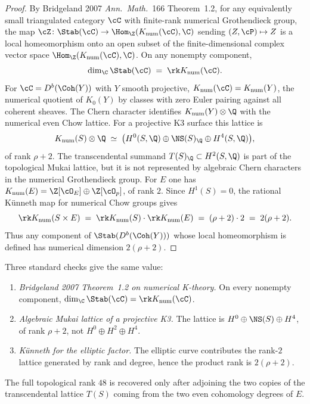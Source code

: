 \begin{proof}
By Bridgeland 2007 \emph{Ann.\ Math.}~166 Theorem~1.2, for any equivalently small triangulated category $\cC$ with finite-rank numerical Grothendieck group, the map $\cZ \colon \Stab(\cC) \to \Hom_\Z(K_{\mathrm{num}}(\cC), \C)$ sending $(Z, \cP) \mapsto Z$ is a local homeomorphism onto an open subset of the finite-dimensional complex vector space $\Hom_\Z(K_{\mathrm{num}}(\cC), \C)$. On any nonempty component,
\[
 \dim_\C \Stab(\cC) \;=\; \rk K_{\mathrm{num}}(\cC).
\]
For $\cC = D^b(\Coh(Y))$ with $Y$ smooth projective, $K_{\mathrm{num}}(\cC) = K_{\mathrm{num}}(Y)$, the numerical quotient of $K_0(Y)$ by classes with zero Euler pairing against all coherent sheaves. The Chern character identifies $K_{\mathrm{num}}(Y) \otimes \Q$ with the numerical even Chow lattice. For a projective K3 surface this lattice is
\[
 K_{\mathrm{num}}(S) \otimes \Q
 \;\simeq\;
 \bigl(H^0(S,\Q) \oplus \NS(S)_\Q \oplus H^4(S,\Q)\bigr),
\]
of rank $\rho+2$. The transcendental summand $T(S)_\Q \subset H^2(S,\Q)$ is part of the topological Mukai lattice, but it is not represented by algebraic Chern characters in the numerical Grothendieck group. For $E$ one has $K_{\mathrm{num}}(E)=\Z[\cO_E]\oplus \Z[\cO_p]$, of rank $2$. Since $H^1(S)=0$, the rational K\"unneth map for numerical Chow groups gives
\[
 \rk K_{\mathrm{num}}(S \times E)
 \;=\; \rk K_{\mathrm{num}}(S) \cdot \rk K_{\mathrm{num}}(E)
 \;=\; (\rho+2)\cdot 2
 \;=\; 2(\rho+2).
\]
Thus any component of $\Stab(D^b(\Coh(Y)))$ whose local homeomorphism is defined has numerical dimension $2(\rho+2)$.
\end{proof}

\begin{remark}
\label{rem:dcy-stab-48-multipath}
Three standard checks give the same value:
\begin{enumerate}[label=\textup{(\roman*)}]
\item \emph{Bridgeland 2007 Theorem~1.2 on numerical K-theory.} On every nonempty component, $\dim_\C \Stab(\cC)=\rk K_{\mathrm{num}}(\cC)$.
\item \emph{Algebraic Mukai lattice of a projective K3.} The lattice is $H^0\oplus\NS(S)\oplus H^4$, of rank $\rho+2$, not $H^0\oplus H^2\oplus H^4$.
\item \emph{K\"unneth for the elliptic factor.} The elliptic curve contributes the rank-$2$ lattice generated by rank and degree, hence the product rank is $2(\rho+2)$.
\end{enumerate}
The full topological rank $48$ is recovered only after adjoining the two copies of the transcendental lattice $T(S)$ coming from the two even cohomology degrees of $E$.
\end{remark}

